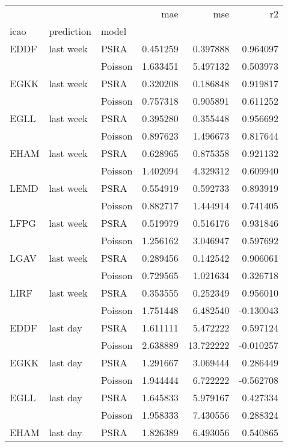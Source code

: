 \begin{tabular}{lllrrr}
\toprule
     &          &      &       mae &        mse &        r2 \\
icao & prediction & model &           &            &           \\
\midrule
EDDF & last week & PSRA &  0.451259 &   0.397888 &  0.964097 \\
     &          & Poisson &  1.633451 &   5.497132 &  0.503973 \\
EGKK & last week & PSRA &  0.320208 &   0.186848 &  0.919817 \\
     &          & Poisson &  0.757318 &   0.905891 &  0.611252 \\
EGLL & last week & PSRA &  0.395280 &   0.355448 &  0.956692 \\
     &          & Poisson &  0.897623 &   1.496673 &  0.817644 \\
EHAM & last week & PSRA &  0.628965 &   0.875358 &  0.921132 \\
     &          & Poisson &  1.402094 &   4.329312 &  0.609940 \\
LEMD & last week & PSRA &  0.554919 &   0.592733 &  0.893919 \\
     &          & Poisson &  0.882717 &   1.444914 &  0.741405 \\
LFPG & last week & PSRA &  0.519979 &   0.516176 &  0.931846 \\
     &          & Poisson &  1.256162 &   3.046947 &  0.597692 \\
LGAV & last week & PSRA &  0.289456 &   0.142542 &  0.906061 \\
     &          & Poisson &  0.729565 &   1.021634 &  0.326718 \\
LIRF & last week & PSRA &  0.353555 &   0.252349 &  0.956010 \\
     &          & Poisson &  1.751448 &   6.482540 & -0.130043 \\
EDDF & last day & PSRA &  1.611111 &   5.472222 &  0.597124 \\
     &          & Poisson &  2.638889 &  13.722222 & -0.010257 \\
EGKK & last day & PSRA &  1.291667 &   3.069444 &  0.286449 \\
     &          & Poisson &  1.944444 &   6.722222 & -0.562708 \\
EGLL & last day & PSRA &  1.645833 &   5.979167 &  0.427334 \\
     &          & Poisson &  1.958333 &   7.430556 &  0.288324 \\
EHAM & last day & PSRA &  1.826389 &   6.493056 &  0.540865 \\

\end{tabular}
